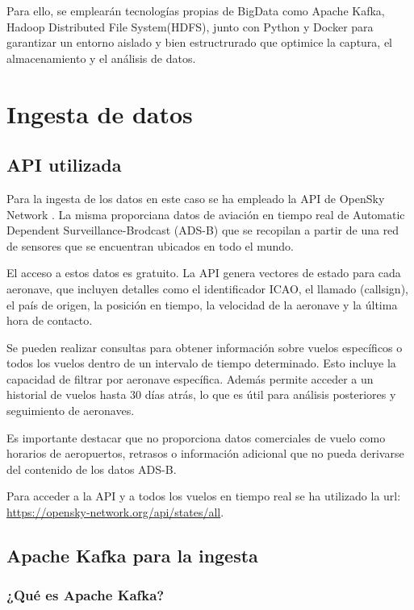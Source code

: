 \documentclass{article}
\begin{document}
Para ello, se emplearán tecnologías propias de BigData como Apache Kafka, Hadoop Distributed File System(HDFS), junto con Python y Docker para garantizar un entorno aislado y bien estructrurado que optimice la captura, el almacenamiento y el análisis de datos. 
\newpage

\section{Ingesta de datos}

\subsection{API utilizada}

Para la ingesta de los datos en este caso se ha empleado la API de OpenSky Network \cite{Schaefer2014}. La misma proporciana datos de aviación en tiempo real de Automatic Dependent Surveillance-Brodcast (ADS-B) que se recopilan a
partir de una red de sensores que se encuentran ubicados en todo el mundo.

El acceso a estos datos es gratuito. La API genera vectores de estado para cada aeronave, que incluyen detalles como el identificador ICAO, el llamado (callsign), el país de origen, la posición en tiempo, la velocidad de la aeronave y la última hora de contacto.

Se pueden realizar consultas para obtener información sobre vuelos específicos o todos los vuelos dentro de un intervalo de tiempo determinado. Esto incluye la capacidad de filtrar por aeronave específica.
Además permite acceder a un historial de vuelos hasta 30 días atrás, lo que es útil para análisis posteriores y seguimiento de aeronaves.

Es importante destacar que no proporciona datos comerciales de vuelo como horarios de aeropuertos, retrasos o información adicional que no pueda derivarse del contenido de los datos ADS-B.

Para acceder a la API y a todos los vuelos en tiempo real se ha utilizado la url: \url{https://opensky-network.org/api/states/all}.

\subsection{Apache Kafka para la ingesta}
\subsubsection{¿Qué es Apache Kafka?}
\end{document}
